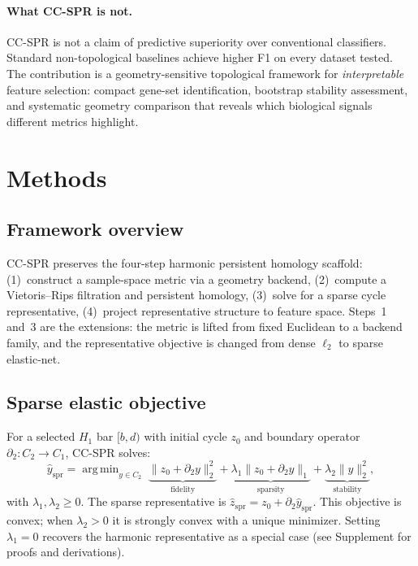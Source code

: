 \documentclass[11pt]{article}
\DeclareMathOperator*{\argmin}{arg\,min}
\begin{document}
\paragraph{What CC-SPR is not.}
CC-SPR is not a claim of predictive superiority over conventional classifiers.
Standard non-topological baselines achieve higher F1 on every dataset tested.
The contribution is a geometry-sensitive topological framework for \emph{interpretable} feature selection: compact gene-set identification, bootstrap stability assessment, and systematic geometry comparison that reveals which biological signals different metrics highlight.

\section{Methods}
\label{sec:methods}

\subsection{Framework overview}

CC-SPR preserves the four-step harmonic persistent homology scaffold:
(1)~construct a sample-space metric via a geometry backend,
(2)~compute a Vietoris--Rips filtration and persistent homology,
(3)~solve for a sparse cycle representative,
(4)~project representative structure to feature space.
Steps~1 and~3 are the extensions: the metric is lifted from fixed Euclidean to a backend family, and the representative objective is changed from dense $\ell_2$ to sparse elastic-net.

\subsection{Sparse elastic objective}
\label{sec:sparse}

For a selected $H_1$ bar $[b, d)$ with initial cycle $z_0$ and boundary operator $\partial_2 : C_2 \to C_1$, CC-SPR solves:
\begin{equation}\label{eq:ccspr}
\hat{y}_{\mathrm{spr}} = \argmin_{y \in C_2} \;\underbrace{\| z_0 + \partial_2 y \|_2^2}_{\text{fidelity}} + \underbrace{\lambda_1 \| z_0 + \partial_2 y \|_1}_{\text{sparsity}} + \underbrace{\lambda_2 \| y \|_2^2}_{\text{stability}},
\end{equation}
with $\lambda_1, \lambda_2 \ge 0$.
The sparse representative is $\hat{z}_{\mathrm{spr}} = z_0 + \partial_2 \hat{y}_{\mathrm{spr}}$.
This objective is convex; when $\lambda_2 > 0$ it is strongly convex with a unique minimizer.
Setting $\lambda_1 = 0$ recovers the harmonic representative as a special case (see Supplement for proofs and derivations).
\end{document}
